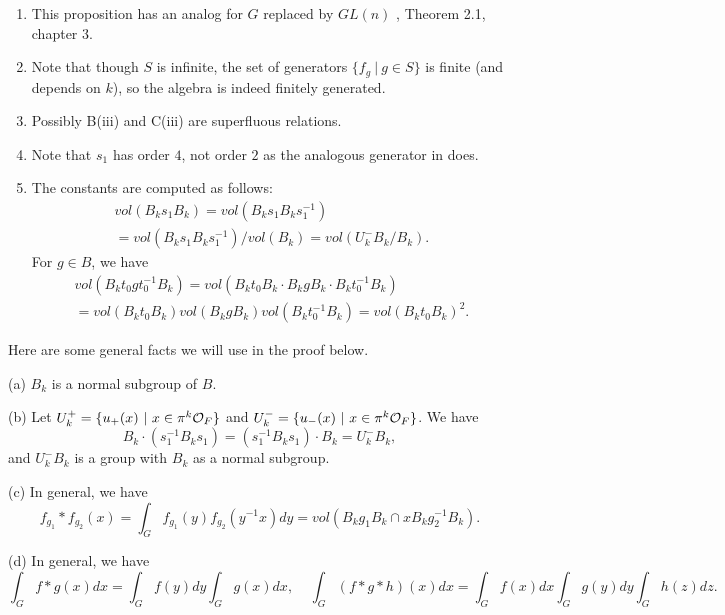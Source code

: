 \begin{remark} 

{\it 
\begin{enumerate}

\item
This proposition has an analog for $G$ replaced by 
$GL(n)$ \cite{H}, Theorem 2.1, chapter 3. 

\item
Note that though $S$ is infinite, the set of
generators $\{f_g\ |\ g\in S\}$ is finite (and depends on
$k$), so the algebra is indeed finitely generated.

\item
 Possibly B(iii) and C(iii) are superfluous relations. 

\item
 Note that $s_1$ has order $4$, not order $2$ as the analogous
generator in \cite{H} does.

\item
 The constants are computed as follows:
\[
\begin{array}{c}
vol(B_k s_1 B_k)=
vol(B_k s_1 B_ks_1^{-1})\\
=vol(B_k s_1 B_ks_1^{-1})/vol(B_k)
=vol(U_k^- B_k/B_k).
\end{array}
\]
For $g\in B$, we have
\[
\begin{array}{c}
vol(B_k t_0gt_0^{-1}B_k)
=vol(B_k t_0B_k\cdot B_kgB_k\cdot B_kt_0^{-1}B_k)\\
=vol(B_k t_0B_k)vol(B_kgB_k)vol(B_kt_0^{-1}B_k)
=vol(B_k t_0B_k)^2.
\end{array}
\]
\end{enumerate}
} 
\end{remark}

Here are some general facts we will use in the proof below.

\begin{lemma} (a) $B_k$ is a normal subgroup of $B$.

(b) Let $U^+_k=\{u_+(x)\ |\ x\in \pi^k{\cal O}_F\}$
and $U^-_k=\{u_-(x)\ |\ x\in \pi^k{\cal O}_F\}$.
We have
\[
B_k\cdot (s_1^{-1}B_ks_1)
=(s_1^{-1}B_ks_1)\cdot B_k=U^-_kB_k,
\]
and $U^-_kB_k$ is a group with $B_k$ as a normal subgroup.

(c) In general, we have
\[
f_{g_1}*f_{g_2}(x)=\int_G f_{g_1}(y)f_{g_2}(y^{-1}x)dy
=vol(B_kg_1B_k\cap xB_kg_2^{-1}B_k).
\]

(d) In general, we have
\[
\int_G f*g(x)dx=\int_G f(y)dy
\int_G g(x)dx,\ \ \ \ \ 
\int_G (f*g*h)(x)dx=\int_G f(x)dx
\int_G g(y)dy\int_G h(z)dz.
\]
\label{lemma:9}
\end{lemma}

